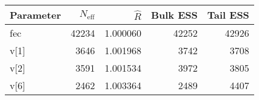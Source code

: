 \begin{table}[!h]
\centering
\begin{tabular}{>{\raggedright\arraybackslash}p{2cm}rrrr}
\toprule
Parameter & $N_{\text{eff}}$ & $\widehat{R}$ & Bulk ESS & Tail ESS\\
\midrule
\rowcolor{gray!6}  fec & 42234 & 1.000060 & 42252 & 42926\\
v[1] & 3646 & 1.001968 & 3742 & 3708\\
\rowcolor{gray!6}  v[2] & 3591 & 1.001534 & 3972 & 3805\\
v[6] & 2462 & 1.003364 & 2489 & 4407\\
\bottomrule
\end{tabular}
\end{table}